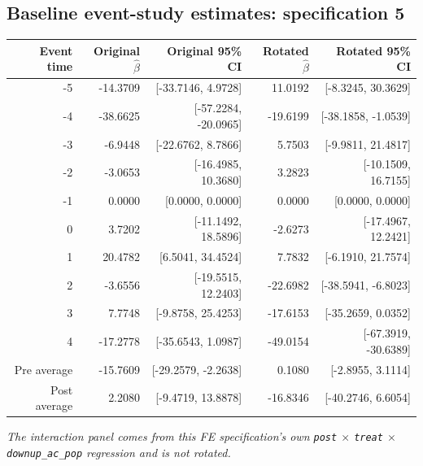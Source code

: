 \documentclass[10pt]{article}
\begin{document}
\subsection*{Baseline event-study estimates: specification 5}
\begin{center}
\scriptsize
\begin{tabular}{r rr rr}
\toprule
Event time & Original $\hat\beta$ & Original 95\% CI & Rotated $\hat\beta$ & Rotated 95\% CI \\
\midrule
-5 & -14.3709 & [-33.7146, 4.9728] & 11.0192 & [-8.3245, 30.3629] \\
-4 & -38.6625 & [-57.2284, -20.0965] & -19.6199 & [-38.1858, -1.0539] \\
-3 & -6.9448 & [-22.6762, 8.7866] & 5.7503 & [-9.9811, 21.4817] \\
-2 & -3.0653 & [-16.4985, 10.3680] & 3.2823 & [-10.1509, 16.7155] \\
-1 & 0.0000 & [0.0000, 0.0000] & 0.0000 & [0.0000, 0.0000] \\
0 & 3.7202 & [-11.1492, 18.5896] & -2.6273 & [-17.4967, 12.2421] \\
1 & 20.4782 & [6.5041, 34.4524] & 7.7832 & [-6.1910, 21.7574] \\
2 & -3.6556 & [-19.5515, 12.2403] & -22.6982 & [-38.5941, -6.8023] \\
3 & 7.7748 & [-9.8758, 25.4253] & -17.6153 & [-35.2659, 0.0352] \\
4 & -17.2778 & [-35.6543, 1.0987] & -49.0154 & [-67.3919, -30.6389] \\
\midrule
Pre average & -15.7609 & [-29.2579, -2.2638] & 0.1080 & [-2.8955, 3.1114] \\
Post average & 2.2080 & [-9.4719, 13.8878] & -16.8346 & [-40.2746, 6.6054] \\
\bottomrule
\end{tabular}
\end{center}
\medskip
\textit{The interaction panel comes from this FE specification's own \texttt{post} $\times$ \texttt{treat} $\times$ \texttt{downup\_ac\_pop} regression and is not rotated.}
\clearpage
\end{document}

